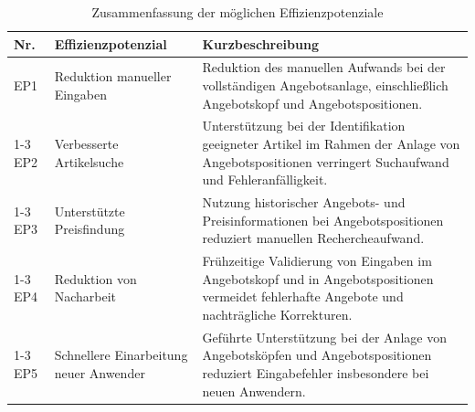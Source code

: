 \begin{table}[H]
\centering
\caption{Zusammenfassung der möglichen Effizienzpotenziale}
\label{tab:effizienzpotenziale}
\begin{tabularx}{\textwidth}{l >{\raggedright\arraybackslash}p{4.2cm} >{\small}X}
\hline
\textbf{Nr.} & \textbf{Effizienzpotenzial} & \textbf{Kurzbeschreibung} \\
\hline
EP1 & Reduktion manueller Eingaben &
Reduktion des manuellen Aufwands bei der vollständigen Angebotsanlage, einschließlich Angebotskopf und Angebotspositionen. \\
\cline{1-3}
EP2 & Verbesserte Artikelsuche &
Unterstützung bei der Identifikation geeigneter Artikel im Rahmen der Anlage von Angebotspositionen verringert Suchaufwand und Fehleranfälligkeit. \\
\cline{1-3}
EP3 & Unterstützte Preisfindung &
Nutzung historischer Angebots- und Preisinformationen bei Angebotspositionen reduziert manuellen Rechercheaufwand. \\
\cline{1-3}
EP4 & Reduktion von Nacharbeit &
Frühzeitige Validierung von Eingaben im Angebotskopf und in Angebotspositionen vermeidet fehlerhafte Angebote und nachträgliche Korrekturen. \\
\cline{1-3}
EP5 & Schnellere Einarbeitung neuer Anwender &
Geführte Unterstützung bei der Anlage von Angebotsköpfen und Angebotspositionen reduziert Eingabefehler insbesondere bei neuen Anwendern. \\
\hline
\end{tabularx}
\end{table}
